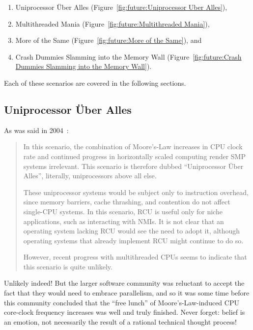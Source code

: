 \begin{enumerate}
\item	Uniprocessor \"Uber Alles
	(Figure~\ref{fig:future:Uniprocessor Uber Alles}),
\item	Multithreaded Mania
	(Figure~\ref{fig:future:Multithreaded Mania}),
\item	More of the Same
	(Figure~\ref{fig:future:More of the Same}), and
\item	Crash Dummies Slamming into the Memory Wall
	(Figure~\ref{fig:future:Crash Dummies Slamming into the Memory Wall}).
\end{enumerate}

Each of these scenarios are covered in the following sections.

\subsection{Uniprocessor \"Uber Alles}
\label{sec:future:Uniprocessor Uber Alles}

As was said in 2004~\cite{PaulEdwardMcKenneyPhD}:

\begin{quote}
	In this scenario, the combination of Moore's-Law increases in CPU
	clock rate and continued progress in horizontally scaled computing
	render SMP systems irrelevant.
	This scenario is therefore dubbed ``Uniprocessor \"Uber
	Alles'', literally, uniprocessors above all else.

	These uniprocessor systems would be subject only to instruction
	overhead, since memory barriers, cache thrashing, and contention
	do not affect single-CPU systems.
	In this scenario, RCU is useful only for niche applications, such
	as interacting with NMIs.
	It is not clear that an operating system lacking RCU would see
	the need to adopt it, although operating
	systems that already implement RCU might continue to do so.

	However, recent progress with multithreaded CPUs seems to indicate
	that this scenario is quite unlikely.
\end{quote}

Unlikely indeed!
But the larger software community was reluctant to accept the fact that
they would need to embrace parallelism, and so it was some time before
this community concluded that the ``free lunch'' of Moore's-Law-induced
CPU core-clock frequency increases was well and truly finished.
Never forget: belief is an emotion, not necessarily the result of a
rational technical thought process!

